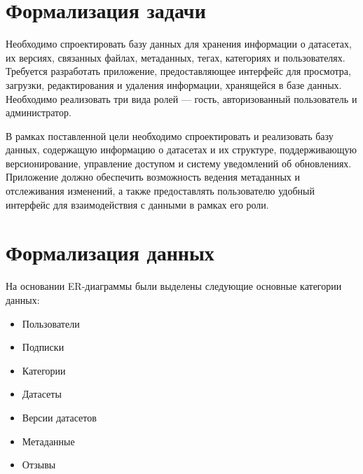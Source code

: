 \section{Формализация задачи}

Необходимо спроектировать базу данных для хранения информации о датасетах, их версиях, связанных файлах,
метаданных, тегах, категориях и пользователях. Требуется разработать приложение, предоставляющее интерфейс для просмотра,
загрузки, редактирования и удаления информации, хранящейся в базе данных.
Необходимо реализовать три вида ролей — гость, авторизованный пользователь и администратор.

В рамках поставленной цели необходимо спроектировать и реализовать базу данных,
содержащую информацию о датасетах и их структуре, поддерживающую версионирование, управление доступом и систему
уведомлений об обновлениях. Приложение должно обеспечить возможность ведения метаданных и
отслеживания изменений, а также предоставлять пользователю удобный интерфейс для взаимодействия с данными в рамках его
роли.

\section{Формализация данных}

На основании ER-диаграммы были выделены следующие основные категории данных:

\begin{itemize}
  \item Пользователи
  \item Подписки
  \item Категории
  \item Датасеты
  \item Версии датасетов
  \item Метаданные
  \item Отзывы
\end{itemize}


